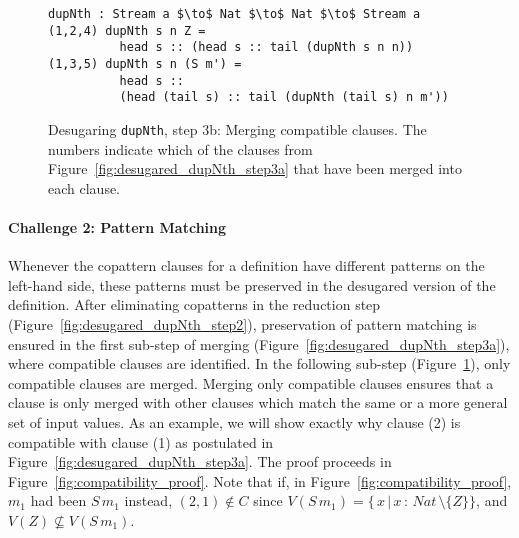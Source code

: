 \begin{figure}[h]
\begin{lstlisting}[mathescape,title=\idrisBlock]
dupNth : Stream a $\to$ Nat $\to$ Nat $\to$ Stream a
(1,2,4) dupNth s n Z = 
          head s :: (head s :: tail (dupNth s n n))
(1,3,5) dupNth s n (S m') = 
          head s :: 
          (head (tail s) :: tail (dupNth (tail s) n m'))
\end{lstlisting}
  \caption{Desugaring \texttt{dupNth}, step 3b: Merging compatible
    clauses. The numbers indicate which of the clauses from
    Figure~\ref{fig:desugared_dupNth_step3a} that have been merged into each clause.}
  \label{fig:desugared_dupNth_step3b}
\end{figure}

\paragraph{Challenge 2: Pattern Matching}
Whenever the copattern clauses for a definition have different patterns on the
left-hand side, these patterns must be preserved in the desugared version of the
definition. After eliminating copatterns in the reduction step
(Figure~\ref{fig:desugared_dupNth_step2}), preservation of pattern matching is
ensured in the first sub-step of merging
(Figure~\ref{fig:desugared_dupNth_step3a}), where compatible clauses are
identified. In the following sub-step (Figure~\ref{fig:desugared_dupNth_step3b}), only compatible clauses are
merged. Merging only compatible clauses ensures that a clause is only merged
with other clauses which match the same or a more general set of input values. As an example, we will show exactly why clause (2) is compatible
with clause (1) as postulated in
Figure~\ref{fig:desugared_dupNth_step3a}. The proof
proceeds in Figure~\ref{fig:compatibility_proof}. Note that if, in Figure~\ref{fig:compatibility_proof}, $m_{1}$ had been
$S\,m_{1}$ instead, $(2,1)\notin C$ since $V(S\,m_{1}) =
\{\,x\,|\,x\,:\,Nat\,\setminus\{Z\}\}$, and $V(Z)\not\subseteq V(S\,m_{1})$.

